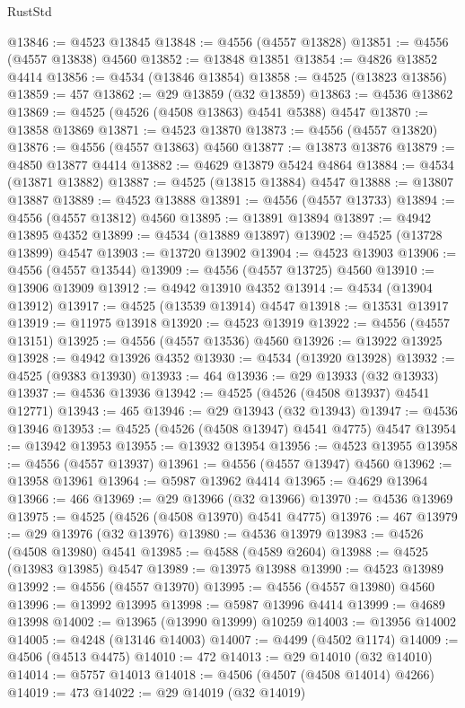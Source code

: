 \begin{lexlean}{RustStd}
\begin{coremodule}
@13846 := @4523 @13845
@13848 := @4556 (@4557 @13828)
@13851 := @4556 (@4557 @13838) @4560
@13852 := @13848 @13851
@13854 := @4826 @13852 @4414
@13856 := @4534 (@13846 @13854)
@13858 := @4525 (@13823 @13856)
@13859 := 457
@13862 := @29 @13859 (@32 @13859)
@13863 := @4536 @13862
@13869 := @4525 (@4526 (@4508 @13863) @4541 @5388) @4547
@13870 := @13858 @13869
@13871 := @4523 @13870
@13873 := @4556 (@4557 @13820)
@13876 := @4556 (@4557 @13863) @4560
@13877 := @13873 @13876
@13879 := @4850 @13877 @4414
@13882 := @4629 @13879 @5424 @4864
@13884 := @4534 (@13871 @13882)
@13887 := @4525 (@13815 @13884) @4547
@13888 := @13807 @13887
@13889 := @4523 @13888
@13891 := @4556 (@4557 @13733)
@13894 := @4556 (@4557 @13812) @4560
@13895 := @13891 @13894
@13897 := @4942 @13895 @4352
@13899 := @4534 (@13889 @13897)
@13902 := @4525 (@13728 @13899) @4547
@13903 := @13720 @13902
@13904 := @4523 @13903
@13906 := @4556 (@4557 @13544)
@13909 := @4556 (@4557 @13725) @4560
@13910 := @13906 @13909
@13912 := @4942 @13910 @4352
@13914 := @4534 (@13904 @13912)
@13917 := @4525 (@13539 @13914) @4547
@13918 := @13531 @13917
@13919 := @11975 @13918
@13920 := @4523 @13919
@13922 := @4556 (@4557 @13151)
@13925 := @4556 (@4557 @13536) @4560
@13926 := @13922 @13925
@13928 := @4942 @13926 @4352
@13930 := @4534 (@13920 @13928)
@13932 := @4525 (@9383 @13930)
@13933 := 464
@13936 := @29 @13933 (@32 @13933)
@13937 := @4536 @13936
@13942 := @4525 (@4526 (@4508 @13937) @4541 @12771)
@13943 := 465
@13946 := @29 @13943 (@32 @13943)
@13947 := @4536 @13946
@13953 := @4525 (@4526 (@4508 @13947) @4541 @4775) @4547
@13954 := @13942 @13953
@13955 := @13932 @13954
@13956 := @4523 @13955
@13958 := @4556 (@4557 @13937)
@13961 := @4556 (@4557 @13947) @4560
@13962 := @13958 @13961
@13964 := @5987 @13962 @4414
@13965 := @4629 @13964
@13966 := 466
@13969 := @29 @13966 (@32 @13966)
@13970 := @4536 @13969
@13975 := @4525 (@4526 (@4508 @13970) @4541 @4775)
@13976 := 467
@13979 := @29 @13976 (@32 @13976)
@13980 := @4536 @13979
@13983 := @4526 (@4508 @13980) @4541
@13985 := @4588 (@4589 @2604)
@13988 := @4525 (@13983 @13985) @4547
@13989 := @13975 @13988
@13990 := @4523 @13989
@13992 := @4556 (@4557 @13970)
@13995 := @4556 (@4557 @13980) @4560
@13996 := @13992 @13995
@13998 := @5987 @13996 @4414
@13999 := @4689 @13998
@14002 := @13965 (@13990 @13999) @10259
@14003 := @13956 @14002
@14005 := @4248 (@13146 @14003)
@14007 := @4499 (@4502 @1174)
@14009 := @4506 (@4513 @4475)
@14010 := 472
@14013 := @29 @14010 (@32 @14010)
@14014 := @5757 @14013
@14018 := @4506 (@4507 (@4508 @14014) @4266)
@14019 := 473
@14022 := @29 @14019 (@32 @14019)

\end{coremodule}
\end{lexlean}
